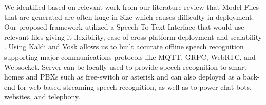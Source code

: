 \documentclass{article}
\begin{document}
We identified based on relevant work from our literature review that Model Files that are generated are often huge in Size which causes difficulty in deployment. Our proposed framework utilized a Speech To Text Interface that would use relevant files giving it flexibility, ease of cross-platform deployment and scalability \cite{alphacep_vosk_2022}. Using Kaldi and Vosk \cite{alphacep_alphacepvosk-server_2022} allows us to built accurate offline speech recognition supporting major communications protocols like MQTT, GRPC, WebRTC, and Websocket. Server can be locally used to provide speech recognition to smart homes and PBXs such as free-switch or asterisk and can also deployed as a back-end for web-based streaming speech recognition, as well as to power chat-bots, websites, and telephony.




\end{document}

